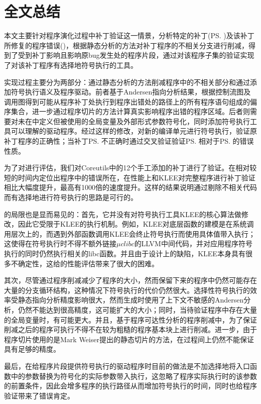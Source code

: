 \chapter{全文总结}

本文主要针对程序演化过程中补丁验证这一情景，分析特定的补丁(\patch\ps )及该补丁所修复的程序错误(\patch\bs )，根据静态分析的方法对补丁程序的不相关分支进行削减，得到了受到补丁影响且影响原bug发生处的程序片段，通过对该程序子集的验证实现了对该补丁程序有选择地符号执行的工具\dryrun。

实现过程主要分为两部分：通过静态分析的方法削减程序中的不相关部分和通过添加符号执行语义及程序驱动。前者基于Andersen指向分析结果，根据控制流图及调用图得到可能从程序补丁处执行到程序出错处的路径上的所有程序语句组成的偏序集合，进一步通过程序切片的方法计算真实影响程序出错的程序区域\rbscope 。后者则需要对未在\rbscope 中定义但被使用的全局变量及外部形式参数符号化，同时添加符号执行工具可以理解的驱动程序。经过这样的修改，对新的编译单元进行符号执行，验证原补丁程序\patch 的正确性；当补丁\patch\ps 不正确时通过交叉验证验证\patch\ps 相对于\bug\ps 的错误性质。

为了对\dryrun 进行评估，我们对Coreutils中的12个手工添加的补丁进行了验证。\dryrun 在相对较短的时间内定位出程序中的错误所在，在性能上和KLEE对完整程序进行补丁验证相比大幅度提升，最高有1000倍的速度提升。这样的结果说明通过剔除不相关代码而有选择地进行符号执行的思路是可行的。

\dryrun 的局限也是显而易见的：首先，它并没有对符号执行工具KLEE的核心算法做修改，因此它受限于KLEE的执行机制。例如，KLEE对底层函数的建模是在系统调用层次上的，而遇到外部函数调用KLEE会终止符号执行而使用具体值带入执行；这使得\dryrun 在符号执行时不得不额外链接$\mu clibc$的LLVM中间代码，并对应用程序符号执行的同时仍然执行相关的libc函数。并且由于设计上的缺陷，KLEE本身具有很多不确定性，这给\dryrun 的性能评估带来了很大的困难。

其次，尽管通过程序削减减少了程序的大小，然而保留下来的程序中仍然可能存在大量的分支循环结构，这种情况下符号执行的代价仍然很大。\dryrun 选择性符号执行的效率受静态指向分析精度影响很大，然而生成\rbscope 时使用了上下文不敏感的Andersen分析，仍然不能达到很高精度，这可能扩大\rbscope 的大小；同时，当待验证程序中存在大量的全局变量时，\rbscope 有可能更大。并且，基于程序可达性分析的程序削减中，为了保证削减之后的程序可执行不得不在较为粗糙的程序基本块上进行削减。进一步，由于程序切片使用的是Mark Weiser提出的静态切片的方法，在过程间上仍然不能保证具有足够的精度。

最后，在给程序片段提供符号执行的驱动程序时目前的做法是不加选择地将入口函数中的参数替换为符号化的实际参数带入执行，这忽略了程序实际执行时的该参数的前置条件，因此会增多程序的执行路径从而增加符号执行的时间，同时也给程序验证带来了错误肯定。

